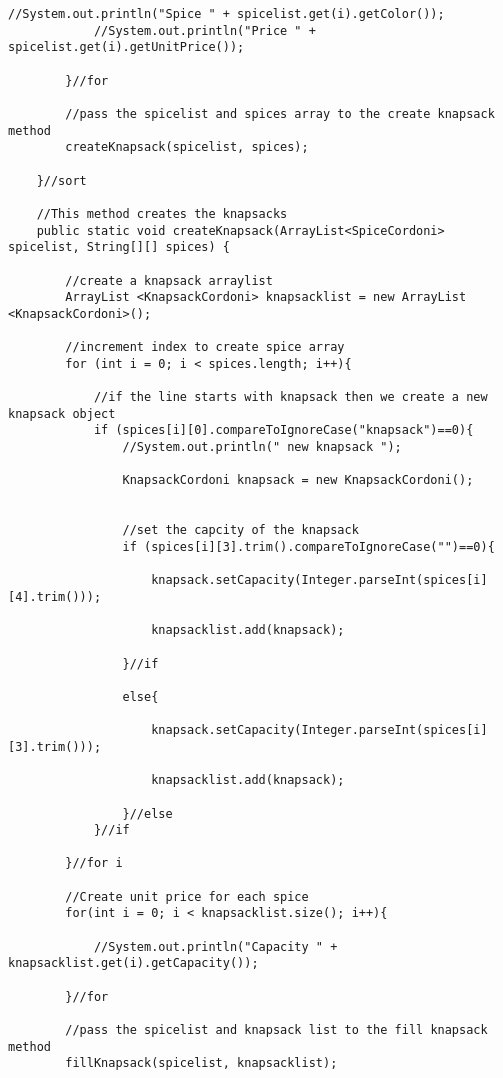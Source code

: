 \documentclass[letterpaper, 10pt,DIV=13]{scrartcl}
\numberwithin{equation}{section} %
\numberwithin{figure}{section} %
\numberwithin{table}{section} %
\begin{document}
\begin{lstlisting}[frame=single, ]
            //System.out.println("Spice " + spicelist.get(i).getColor());
            //System.out.println("Price " + spicelist.get(i).getUnitPrice());

        }//for

        //pass the spicelist and spices array to the create knapsack method
        createKnapsack(spicelist, spices);

    }//sort

    //This method creates the knapsacks
    public static void createKnapsack(ArrayList<SpiceCordoni> spicelist, String[][] spices) {
 
        //create a knapsack arraylist
        ArrayList <KnapsackCordoni> knapsacklist = new ArrayList <KnapsackCordoni>();
        
        //increment index to create spice array
        for (int i = 0; i < spices.length; i++){

            //if the line starts with knapsack then we create a new knapsack object
            if (spices[i][0].compareToIgnoreCase("knapsack")==0){
                //System.out.println(" new knapsack ");

                KnapsackCordoni knapsack = new KnapsackCordoni();


                //set the capcity of the knapsack
                if (spices[i][3].trim().compareToIgnoreCase("")==0){

                    knapsack.setCapacity(Integer.parseInt(spices[i][4].trim()));
                            
                    knapsacklist.add(knapsack);

                }//if

                else{

                    knapsack.setCapacity(Integer.parseInt(spices[i][3].trim()));
                        
                    knapsacklist.add(knapsack);

                }//else
            }//if  
            
        }//for i
         
        //Create unit price for each spice
        for(int i = 0; i < knapsacklist.size(); i++){

            //System.out.println("Capacity " + knapsacklist.get(i).getCapacity());

        }//for

        //pass the spicelist and knapsack list to the fill knapsack method
        fillKnapsack(spicelist, knapsacklist);


\end{lstlisting}
\end{document}
